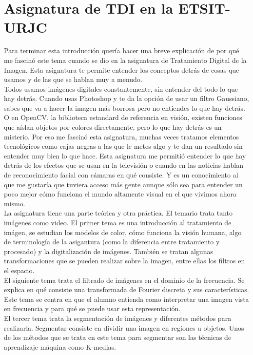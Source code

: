 \section{Asignatura de TDI en la ETSIT-URJC}

Para terminar esta introducción quería hacer una breve explicación de por qué me fascinó este tema cuando se dio en la asignatura de Tratamiento Digital de la Imagen. Esta asignatura te permite entender los conceptos detrás de cosas que usamos y de las que se hablan muy a menudo.\\

Todos usamos imágenes digitales constantemente, sin entender del todo lo que hay detrás. Cuando usas Photoshop y te da la opción de usar un filtro Gaussiano, sabes que va a hacer la imagen más borrosa pero no entiendes lo que hay detrás. O en OpenCV, la biblioteca estandard de referencia en visión, existen funciones que aíslan objetos por colores directamente, pero lo que hay detrás es un misterio. Por eso me fascinó esta asignatura, muchas veces tratamos elementos tecnológicos como cajas negras a las que le metes algo y te dan un resultado sin entender muy bien lo que hace. Esta asignatura me permitió entender lo que hay detrás de los efectos que se usan en la televisión o cuando en las noticias hablan de reconocimiento facial con cámaras en qué consiste. Y es un conocimiento al que me gustaría que tuviera acceso más gente aunque sólo sea para entender un poco mejor cómo funciona el mundo altamente visual en el que vivimos ahora mismo.\\

La asignatura tiene una parte teórica y otra práctica\cite{guia}. El temario trata tanto imágenes como video. El primer tema es una introducción al tratamiento de imágen, se estudian los modelos de color, cómo funciona la visión humana, algo de terminología de la asigantura (como la diferencia entre tratamiento y procesado) y la digitalización de imágenes. También se tratan algunas transformaciones que se pueden realizar sobre la imagen, entre ellas los filtros en el espacio.\\

El siguiente tema trata el filtrado de imágenes en el dominio de la frecuencia. Se explica en qué consiste una transformada de Fourier discreta y sus características. Este tema se centra en que el alumno entienda como interpretar una imagen vista en frecuencia y para qué se puede usar esta representación.\\

El tercer tema trata la segmentación de imágenes y diferentes métodos para realizarla. Segmentar consiste en dividir una imagen en regiones u objetos. Unos de los métodos que se trata en este tema para segmentar son las técnicas de aprendizaje máquina como K-medias.\\

